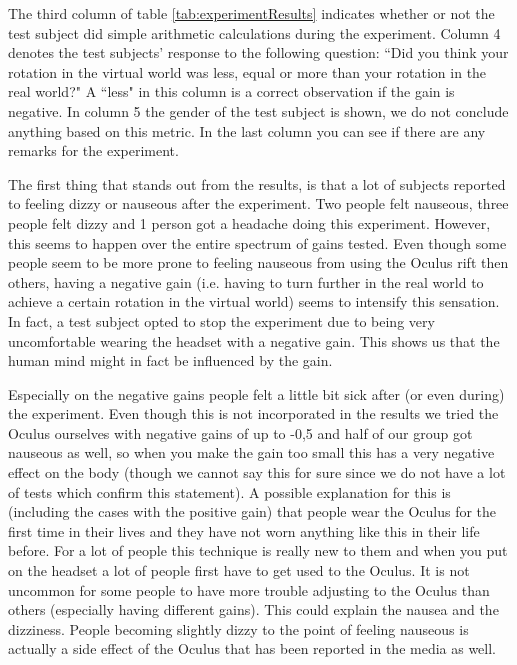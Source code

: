 The third column of table \ref{tab:experimentResults} indicates whether or not the test subject did simple arithmetic calculations during the experiment.
Column 4 denotes the test subjects'  response to the following question: ``Did you think your rotation in the virtual world was less, equal or more than your rotation in the real world?"
A ``less" in this column is a correct observation if the gain is negative.
In column 5 the gender of the test subject is shown, we do not conclude anything based on this metric.
In the last column you can see if there are any remarks for the experiment.

The first thing that stands out from the results, is that a lot of subjects reported to feeling dizzy or nauseous after the experiment.
Two people felt nauseous, three people felt dizzy and 1 person got a headache doing this experiment.
However, this seems to happen over the entire spectrum of gains tested.
Even though some people seem to be more prone to feeling nauseous from using the Oculus rift then others, having a negative gain (i.e. having to turn further in the real world to achieve a certain rotation in the virtual world) seems to intensify this sensation.
In fact, a test subject opted to stop the experiment due to being very uncomfortable wearing the headset with a negative gain.
This shows us that the human mind might in fact be influenced by the gain.

Especially on the negative gains people felt a little bit sick after (or even during) the experiment.
Even though this is not incorporated in the results we tried the Oculus ourselves with negative gains of up to -0,5 and half of our group got nauseous as well, so when you make the gain too small this has a very negative effect on the body (though we cannot say this for sure since we do not have a lot of tests which confirm this statement).
A possible explanation for this is (including the cases with the positive gain) that people wear the Oculus for the first time in their lives and they have not worn anything like this in their life before.
For a lot of people this technique is really new to them and when you put on the headset a lot of people first have to get used to the Oculus.
It is not uncommon for some people to have more trouble adjusting to the Oculus than others (especially having different gains).
This could explain the nausea and the dizziness.
People becoming slightly dizzy to the point of feeling nauseous is actually a side effect of the Oculus that has been reported in the media as well.

